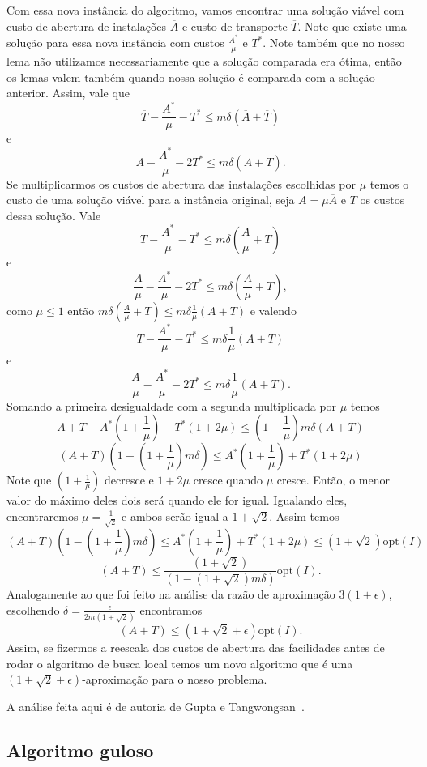\documentclass[12pt]{article}
\newcommand{\opt}{\ensuremath{\mathrm{opt}}}
\begin{document}
Com essa nova instância do algoritmo, vamos encontrar uma solução viável com custo de abertura de instalações $\overline{A}$ e custo de transporte $\overline{T}$. Note que existe uma solução para essa nova instância com custos $\frac{A^*}{\mu}$ e $T^*$. Note também que no nosso lema não utilizamos necessariamente que a solução comparada era ótima, então os lemas valem também quando nossa solução é comparada com a solução anterior. Assim, vale que
\[ \overline{T} - \frac{A^*}{\mu} - T^* \leq m\delta(\overline{A} + \overline{T})\]
e
\[ \overline{A} - \frac{A^*}{\mu} - 2T^* \leq m\delta(\overline{A} + \overline{T}).\]
Se multiplicarmos os custos de abertura das instalações escolhidas por $\mu$ temos o custo de uma solução viável para a instância original, seja $A = \mu\overline{A}$ e $T$ os custos dessa solução. Vale
\[ T - \frac{A^*}{\mu} - T^* \leq m\delta(\frac{A}{\mu}+ T)\]
e
\[ \frac{A}{\mu} - \frac{A^*}{\mu} - 2T^* \leq m\delta(\frac{A}{\mu} + T),\]
como $\mu \leq 1$ então $m\delta(\frac{A}{\mu}+ T) \leq m\delta\frac{1}{\mu}( A + T)$ e valendo 
\[T - \frac{A^*}{\mu} - T^* \leq m\delta\frac{1}{\mu}( A + T) \] 
e 
\[ \frac{A}{\mu} - \frac{A^*}{\mu} - 2T^* \leq m\delta\frac{1}{\mu}( A + T) .\]
Somando a primeira desigualdade com a segunda multiplicada por $\mu$ temos
\[A + T - A^* (1 + \frac{1}{\mu}) - T^*(1 + 2\mu) \leq (1 + \frac{1}{\mu})m\delta(A+T)\]
\[(A+T)(1 - (1+\frac{1}{\mu})m\delta)\leq A^* (1 + \frac{1}{\mu}) + T^*(1 + 2\mu)\]
Note que $(1+\frac{1}{\mu})$ decresce e $1 + 2\mu$ cresce quando $\mu$ cresce. Então, o menor valor do máximo deles dois será quando ele for igual. Igualando eles, encontraremos $\mu = \frac{1}{\sqrt{2}}$ e ambos serão igual a $1 + \sqrt{2}$. Assim temos
\[(A+T)(1 - (1+\frac{1}{\mu})m\delta)\leq A^* (1 + \frac{1}{\mu}) + T^*(1 + 2\mu) \leq (1+\sqrt{2})\opt(I)\]
\[(A+T)\leq \frac{(1+\sqrt{2})}{(1 - (1+\sqrt{2 })m\delta)}\opt(I).\]
Analogamente ao que foi feito na análise da razão de aproximação $3(1 + \epsilon)$, escolhendo $\delta = \frac{\epsilon}{2m(1+\sqrt{2})}$ encontramos 
\[(A+T) \leq (1 + \sqrt{2} + \epsilon )\opt(I).\]
Assim, se fizermos a reescala dos custos de abertura das facilidades antes de rodar o algoritmo de busca local temos um novo algoritmo que é uma $(1 + \sqrt{2} + \epsilon )$-aproximação para o nosso problema.

A análise feita aqui é de autoria de Gupta e Tangwongsan~\cite{DBLP:journals/corr/abs-0809-2554}. 
\newpage

\subsection{Algoritmo guloso}


\end{document}
